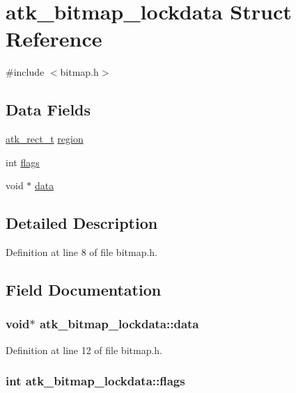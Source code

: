 \hypertarget{structatk__bitmap__lockdata}{\section{atk\+\_\+bitmap\+\_\+lockdata Struct Reference}
\label{structatk__bitmap__lockdata}
}


{\ttfamily \#include $<$bitmap.\+h$>$}

\subsection*{Data Fields}
\begin{DoxyCompactItemize}
\item 
\hyperlink{atk_8h_a943bf72ffba2da2f833e6e995d84e78a}{atk\+\_\+rect\+\_\+t} \hyperlink{structatk__bitmap__lockdata_a75fc9b9740a38278200e4cbe27b15e44}{region}
\item 
int \hyperlink{structatk__bitmap__lockdata_a14548236493d0379a825530a6f512fcc}{flags}
\item 
void $\ast$ \hyperlink{structatk__bitmap__lockdata_a08fd0c82f6a26e24d8533cb944d99a83}{data}
\end{DoxyCompactItemize}


\subsection{Detailed Description}


Definition at line 8 of file bitmap.\+h.



\subsection{Field Documentation}
\hypertarget{structatk__bitmap__lockdata_a08fd0c82f6a26e24d8533cb944d99a83}{
\subsubsection[{data}]{\setlength{\rightskip}{0pt plus 5cm}void$\ast$ atk\+\_\+bitmap\+\_\+lockdata\+::data}}\label{structatk__bitmap__lockdata_a08fd0c82f6a26e24d8533cb944d99a83}


Definition at line 12 of file bitmap.\+h.

\hypertarget{structatk__bitmap__lockdata_a14548236493d0379a825530a6f512fcc}{
\subsubsection[{flags}]{\setlength{\rightskip}{0pt plus 5cm}int atk\+\_\+bitmap\+\_\+lockdata\+::flags}}\label{structatk__bitmap__lockdata_a14548236493d0379a825530a6f512fcc}



